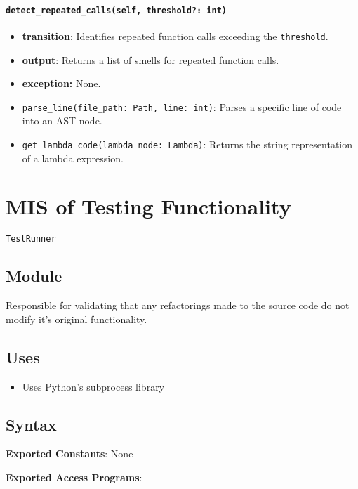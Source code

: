 \documentclass[12pt, titlepage]{article}
\begin{document}
\paragraph{\texttt{detect\_repeated\_calls(self, threshold?: int)}}
\begin{itemize}
  \item \textbf{transition}: Identifies repeated function calls exceeding the \texttt{threshold}.
  \item \textbf{output}: Returns a list of smells for repeated function calls.
  \item \textbf{exception:} None.
\end{itemize}
\begin{itemize}
  \item \texttt{parse\_line(file\_path: Path, line: int)}: Parses a specific line of code into an AST node.
  \item \texttt{get\_lambda\_code(lambda\_node: Lambda)}: Returns the string representation of a lambda expression.
\end{itemize}


\newpage

\section{MIS of Testing Functionality} \label{mis:test}

\texttt{TestRunner}

\subsection{Module}

Responsible for validating that any refactorings made to the source code do not modify it's original functionality.

\subsection{Uses}
\begin{itemize}
  \item Uses Python's subprocess library
\end{itemize}

\subsection{Syntax}
\noindent
\textbf{Exported Constants}: None

\noindent
\textbf{Exported Access Programs}:
\end{document}
